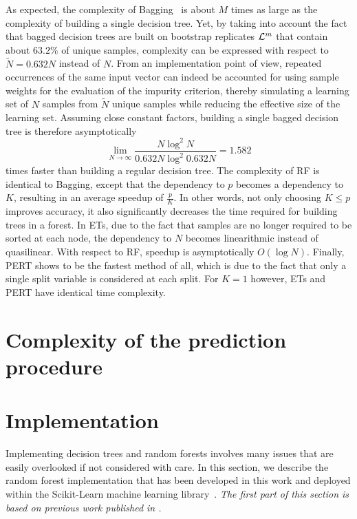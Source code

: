 As expected, the complexity of Bagging~\citep{breiman:1996b} is about $M$ times
as large as the complexity of building a single decision tree. Yet, by taking
into account the fact that bagged decision trees are built on bootstrap
replicates ${\cal L}^m$ that contain about $63.2\%$ of unique samples,
complexity can be expressed with respect to $\widetilde{N} = 0.632 N$ instead
of $N$. From an implementation point of view, repeated occurrences of the same
input vector can indeed be accounted for using sample weights for the
evaluation of the impurity criterion, thereby  simulating a learning set of $N$
samples from $\widetilde{N}$ unique samples while reducing the effective size
of the learning set. Assuming close constant factors, building a single bagged
decision tree is therefore asymptotically
\begin{equation}
\lim_{N\to \infty} \frac{N\log^2 N}{0.632N \log^2 0.632N} = 1.582
\end{equation}
times faster than building a regular decision tree. The complexity of RF is
identical to Bagging, except that the dependency
to $p$ becomes a dependency to $K$, resulting in an average speedup of
$\tfrac{p}{K}$. In other words, not only choosing $K \leq p$ improves accuracy,
it also significantly decreases the time required for building trees in a
forest. In ETs, due to the fact that
samples are no longer required to be sorted at each node, the dependency to $N$
becomes linearithmic instead of quasilinear. With respect to RF,
speedup is asymptotically $O(\log N)$. Finally, PERT shows to be the fastest
method of all, which is due to the fact that only a single split variable
is considered at each split. For $K=1$ however, ETs and PERT have identical
time complexity.


\section{Complexity of the prediction procedure}
\label{sec:5:complexity-predict}

\todo{}



\section{Implementation}
\label{sec:5:impl}

Implementing decision trees and random forests involves many issues that are
easily overlooked if not considered with care. In this section, we describe the
random forest implementation that has been developed in this work and
deployed within the Scikit-Learn machine learning
library~\citep{pedregosa:2011}. \textit{The first part of this section is based
on previous work published in \citep{buitinck:2013}.}

